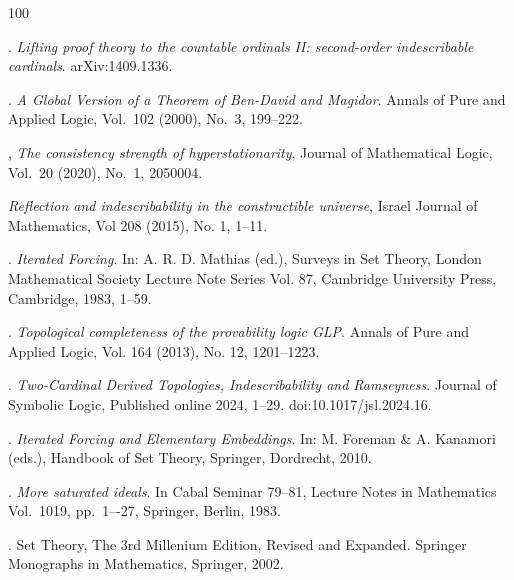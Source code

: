 \documentclass[a4paper,12pt,reqno,oneside]{amsart}
\theoremstyle{plain}
\begin{document}

 

\begin{thebibliography}{100}

.
\emph{Lifting proof theory to the countable ordinals II: second-order indescribable cardinals}.
arXiv:1409.1336.

.
\emph{A Global Version of a Theorem of Ben-David and Magidor}.
Annals of Pure and Applied Logic, Vol.~102 (2000), No.~3, 199--222.

,
\emph{The consistency strength of hyperstationarity},
Journal of Mathematical Logic, Vol.~20 (2020), No.~1, 2050004.

\emph{Reflection and indescribability in the constructible universe},
Israel Journal of Mathematics, Vol 208 (2015), No. 1, 1--11.

. 
\emph{Iterated Forcing}. 
In: A. R. D. Mathias (ed.), Surveys in Set Theory, 
London Mathematical Society Lecture Note Series Vol. 87, 
Cambridge University Press, Cambridge, 1983, 1--59.

.
\emph{Topological completeness of the provability logic GLP}.
Annals of Pure and Applied Logic, Vol. 164 (2013), No. 12, 1201--1223.

. 
\emph{Two-Cardinal Derived Topologies, Indescribability and Ramseyness}. 
Journal of Symbolic Logic, Published online 2024, 1--29. 
doi:10.1017/jsl.2024.16.

. 
\emph{Iterated Forcing and Elementary Embeddings}. 
In: M. Foreman \& A. Kanamori (eds.), Handbook of Set Theory, 
Springer, Dordrecht, 2010.

.
\emph{More saturated ideals}.
In Cabal Seminar 79–81, Lecture Notes in Mathematics Vol.~1019, pp.~1–-27, Springer, Berlin, 1983.

.
{Set Theory, The 3rd Millenium Edition, Revised and Expanded}.
Springer Monographs in Mathematics, Springer, 2002.


\end{thebibliography}
\end{document}
